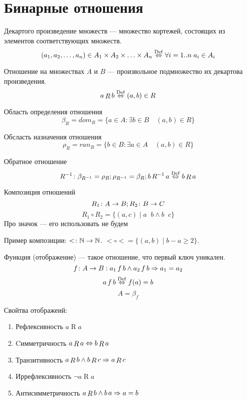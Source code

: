 \section{Бинарные отношения}

\begin{Def}
Декартого произведение множеств --- множество кортежей, состоящих из элементов соответствующих множеств.
$$ \left(a_1, a_2, \ldots, a_n\right) \in A_1 \times A_2 \times \ldots \times A_n \stackrel{\mathrm{Def}}{\Leftrightarrow} \forall i=1..n\; a_i \in A_i $$
\end{Def}
\begin{Def}
Отношение на множествах $A$ и $B$ --- произвольное подмножество их декартова произведения.
$$ a \mathop{R} b \stackrel{\mathrm{Def}}{\Leftrightarrow} (a, b) \in R $$
\end{Def}
\begin{Def}
Область определения отношения 
$$ \beta_R = dom_R = \{a \in A : \exists b \in B \quad (a,b) \in R\} $$
\end{Def}
\begin{Def}
Обсласть назначения отношения 
$$ \rho_R = ran_R =\{b \in B: \exists a \in A \quad (a, b) \in R\}$$
\end{Def}
\begin{Def}
Обратное отношение
$$R^{-1} \colon \beta_{R^{-1}} = \rho_R; \rho_{R^{-1}} = \beta_R; b \mathop{R^{-1}} a \stackrel{\mathrm{Def}}{\Leftrightarrow} b \mathop{R} a$$
\end{Def}
\begin{Def}
Композиция отношений
$$ R_1\colon A \rightarrow B; R_2\colon B \rightarrow C $$
$$ R_1 \circ R_2 = \{(a, c) \mid a \mathop{R_1} b \land b \mathop{R_2} c\} $$
Про значок --- его использовать не будем
\end{Def}

Пример композиции: $<\colon \mathbb{N} \rightarrow \mathbb{N}$. $< \circ < = \{(a, b) \mid b - a \geqslant 2\}$.

\begin{Def}
Функция (отображение) --- такое отношение, что первый ключ уникален.
$$f\colon A \rightarrow B: a_1 \mathop{f} b \land a_2 \mathop{f} b \Rightarrow a_1 = a_2$$
$$ a \mathop{f} b \stackrel{\mathrm{Def}}{\Leftrightarrow} f(a) = b $$
$$ A = \beta_f$$
\end{Def}

\begin{Def}Свойтва отображеий:
\begin{enumerate}
\item Рефлексивность $a \mathop{R} a$
\item Cимметричность $a \mathop{R} a \Leftrightarrow b \mathop{R} a$
\item Транзитивность $a \mathop{R} b \land b \mathop{R} c \Rightarrow a \mathop{R} c$
\item Иррефлексивность $\lnot a \mathop{R} a$
\item Антисимметричность $a \mathop{R} b \land b \mathop a \Rightarrow a = b$
\end{enumerate}
\end{Def}

